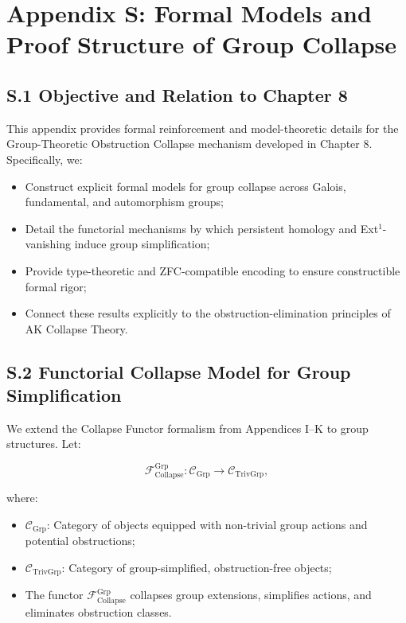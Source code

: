 \documentclass[11pt]{article}
\begin{document}
\section*{Appendix S: Formal Models and Proof Structure of Group Collapse}

\subsection*{S.1 Objective and Relation to Chapter 8}

This appendix provides formal reinforcement and model-theoretic details for the Group-Theoretic Obstruction Collapse mechanism developed in Chapter 8. Specifically, we:

\begin{itemize}
    \item Construct explicit formal models for group collapse across Galois, fundamental, and automorphism groups;
    \item Detail the functorial mechanisms by which persistent homology and Ext$^1$-vanishing induce group simplification;
    \item Provide type-theoretic and ZFC-compatible encoding to ensure constructible formal rigor;
    \item Connect these results explicitly to the obstruction-elimination principles of AK Collapse Theory.
\end{itemize}

\subsection*{S.2 Functorial Collapse Model for Group Simplification}

We extend the Collapse Functor formalism from Appendices I–K to group structures. Let:

\[
\mathcal{F}_{\mathrm{Collapse}}^{\mathrm{Grp}} : \mathcal{C}_{\mathrm{Grp}} \longrightarrow \mathcal{C}_{\mathrm{TrivGrp}},
\]

where:
\begin{itemize}
    \item $\mathcal{C}_{\mathrm{Grp}}$: Category of objects equipped with non-trivial group actions and potential obstructions;
    \item $\mathcal{C}_{\mathrm{TrivGrp}}$: Category of group-simplified, obstruction-free objects;
    \item The functor $\mathcal{F}_{\mathrm{Collapse}}^{\mathrm{Grp}}$ collapses group extensions, simplifies actions, and eliminates obstruction classes.
\end{itemize}
\end{document}
